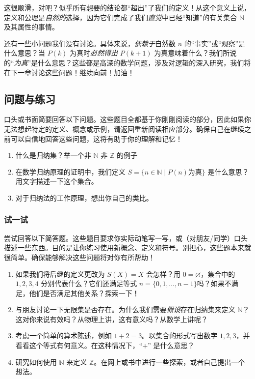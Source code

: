 这很顺滑，对吧？似乎所有想要的结论都“超出”了我们的定义！从这个意义上说，定义和公理是\emph{自然的}选择，因为它们完成了我们\emph{直觉}中已经``知道''的有关集合 $\mathbb{N}$ 及其属性的事情。

还有一些小问题我们没有讨论。具体来说，\emph{依赖于}自然数 $n$ 的``事实''或``观察''是什么意思？当 $P(k)$ 为真时\emph{必然得出} $P(k + 1)$ 为真意味着什么？我们所说的``\emph{为真}''是什么意思？这些都是高深的数学问题，涉及对逻辑的深入研究，我们将在下一章讨论这些问题！继续向前！加油！

\subsection{问题与练习}

口头或书面简要回答以下问题。这些题目全都基于你刚刚阅读的部分，因此如果你无法想起特定的定义、概念或示例，请返回重新阅读相应部分。确保自己在继续之前可以自信地回答这些问题，这将有助于你的理解和记忆！

\begin{enumerate}[label=(\arabic*)]
    \item 什么是归纳集？举一个非 $\mathbb{N}$ 非 $\mathbb{Z}$ 的例子
    \item 在数学归纳原理的证明中，我们定义 $S = \{n \in \mathbb{N} \mid P(n) \text{为真}\}$ 是什么意思？用文字描述一下这个集合。
    \item 对于归纳法的工作原理，想出你自己的类比。
\end{enumerate}

\subsubsection*{试一试}

尝试回答以下简答题。这些题目要求你实际动笔写一写，或（对朋友/同学）口头描述一些东西。目的是让你练习使用新概念、定义和符号。别担心，这些题本来就很简单。确保能够解决这些问题将对你有所帮助！

\begin{enumerate}[label=(\arabic*)]
    \item 如果我们将后继的定义更改为 $S(X) = {X}$ 会怎样？用 $0 = \varnothing$，集合中的 $1,2,3,4$ 分别代表什么？它们还满足等式 $n = \{0, 1, \dots, n - 1\}$吗？如果不满足，他们是否满足其他关系？探索一下！
    \item 与朋友讨论一下无限集是否存在。为什么我们需要\emph{假设}存在归纳集来定义 $\mathbb{N}$？这对你来说有效吗？从物理上讲，这有意义吗？从数学上讲呢？
    \item 考虑一个简单的算术陈述，例如 $1 + 2 = 3$。以集合的形式写出数字 $1,2,3$，并看看这个等式有何意义。在这种情况下，``$+$'' 是什么意思？
    \item 研究如何使用 $\mathbb{N}$ 来定义 $\mathbb{Z}$。在网上或书中进行一些探索，或者自己提出一个想法。
\end{enumerate}